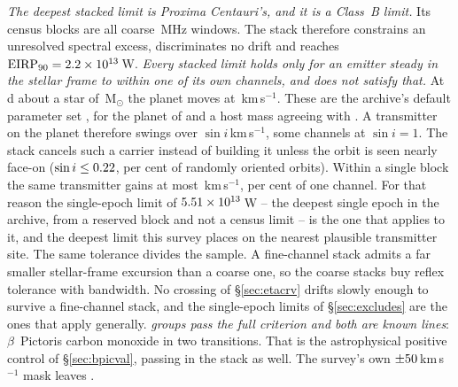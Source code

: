 \emph{The deepest stacked limit is Proxima Centauri's, and it is a Class~B
limit.} Its \SxProxEbCensus{} census blocks are all coarse \ChanBModeMHz\,MHz
windows. The stack therefore constrains an unresolved spectral excess,
discriminates no drift and reaches $\mathrm{EIRP}_{90}=2.2\times10^{13}$\,W.
\emph{Every stacked limit holds only for an emitter steady in the stellar frame
to within one of its own channels, and \PxPlanet{} does not satisfy that.} At
\PxPorbD\,d about a star of \PxMassMsun\,M$_\odot$ the planet moves at
\PxVorbKms\,km\,s$^{-1}$. These are the archive's default parameter set
\citep{NEA2013}, for the planet of \citet{AngladaEscude2016} and a host mass
agreeing with \citet{Kervella2017}. A transmitter on the planet therefore
swings over \PxPPKms$\sin i$\,km\,s$^{-1}$, some \PxNChanWalk{} channels at
$\sin i=1$. The stack cancels such a carrier instead of building it unless the
orbit is seen nearly face-on ($\sin i\le0.22$, \PxIsoPct{} per cent of
randomly oriented orbits). Within a single block the same transmitter gains at most
\PxBlockDvKms\,km\,s$^{-1}$, \PxBlockPct{} per cent of one channel. For that reason the
single-epoch limit of $5.51 \times 10^{13}$\,W -- the deepest single epoch in the
archive, from a reserved block and not a census limit -- is the one that applies
to it, and the deepest limit this survey places on the nearest plausible
transmitter site. The same tolerance
divides the sample. A fine-channel stack admits a far smaller stellar-frame
excursion than a coarse one, so the coarse stacks buy reflex tolerance with
bandwidth. No crossing of \S\ref{sec:etacrv} drifts slowly enough to survive a
fine-channel stack, and the single-epoch limits of \S\ref{sec:excludes} are the
ones that apply generally. \emph{\StkNSurvive{} groups pass the full criterion
and both are known lines}: $\beta$~Pictoris carbon monoxide in two transitions.
That is the astrophysical positive control of \S\ref{sec:bpicval}, passing in
the stack as well. The survey's own $\pm50$\,km\,s$^{-1}$ mask leaves
\StkUnattrClause.

